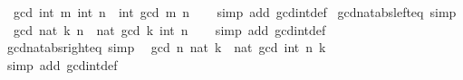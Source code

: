 \begin{isabellebody}
\ \ {\isachardoublequoteopen}gcd\ {\isacharparenleft}{\kern0pt}int\ m{\isacharparenright}{\kern0pt}\ {\isacharparenleft}{\kern0pt}int\ n{\isacharparenright}{\kern0pt}\ {\isacharequal}{\kern0pt}\ int\ {\isacharparenleft}{\kern0pt}gcd\ m\ n{\isacharparenright}{\kern0pt}{\isachardoublequoteclose}\isanewline
%
\isadelimproof
\ \ %
\endisadelimproof
%
\isatagproof
{}\isamarkupfalse%
\ {\isacharparenleft}{\kern0pt}simp\ add{\isacharcolon}{\kern0pt}\ gcd{\isacharunderscore}{\kern0pt}int{\isacharunderscore}{\kern0pt}def{\isacharparenright}{\kern0pt}%
\endisatagproof
{\isafoldproof}%
%
\isadelimproof
\isanewline
%
\endisadelimproof
\isanewline
{}\isamarkupfalse%
\ gcd{\isacharunderscore}{\kern0pt}nat{\isacharunderscore}{\kern0pt}abs{\isacharunderscore}{\kern0pt}left{\isacharunderscore}{\kern0pt}eq\ {\isacharbrackleft}{\kern0pt}simp{\isacharbrackright}{\kern0pt}{\isacharcolon}{\kern0pt}\isanewline
\ \ {\isachardoublequoteopen}gcd\ {\isacharparenleft}{\kern0pt}nat\ {\isasymbar}k{\isasymbar}{\isacharparenright}{\kern0pt}\ n\ {\isacharequal}{\kern0pt}\ nat\ {\isacharparenleft}{\kern0pt}gcd\ k\ {\isacharparenleft}{\kern0pt}int\ n{\isacharparenright}{\kern0pt}{\isacharparenright}{\kern0pt}{\isachardoublequoteclose}\isanewline
%
\isadelimproof
\ \ %
\endisadelimproof
%
\isatagproof
{}\isamarkupfalse%
\ {\isacharparenleft}{\kern0pt}simp\ add{\isacharcolon}{\kern0pt}\ gcd{\isacharunderscore}{\kern0pt}int{\isacharunderscore}{\kern0pt}def{\isacharparenright}{\kern0pt}%
\endisatagproof
{\isafoldproof}%
%
\isadelimproof
\isanewline
%
\endisadelimproof
\isanewline
{}\isamarkupfalse%
\ gcd{\isacharunderscore}{\kern0pt}nat{\isacharunderscore}{\kern0pt}abs{\isacharunderscore}{\kern0pt}right{\isacharunderscore}{\kern0pt}eq\ {\isacharbrackleft}{\kern0pt}simp{\isacharbrackright}{\kern0pt}{\isacharcolon}{\kern0pt}\isanewline
\ \ {\isachardoublequoteopen}gcd\ n\ {\isacharparenleft}{\kern0pt}nat\ {\isasymbar}k{\isasymbar}{\isacharparenright}{\kern0pt}\ {\isacharequal}{\kern0pt}\ nat\ {\isacharparenleft}{\kern0pt}gcd\ {\isacharparenleft}{\kern0pt}int\ n{\isacharparenright}{\kern0pt}\ k{\isacharparenright}{\kern0pt}{\isachardoublequoteclose}\isanewline
%
\isadelimproof
\ \ %
\endisadelimproof
%
\isatagproof
{}\isamarkupfalse%
\ {\isacharparenleft}{\kern0pt}simp\ add{\isacharcolon}{\kern0pt}\ gcd{\isacharunderscore}{\kern0pt}int{\isacharunderscore}{\kern0pt}def{\isacharparenright}{\kern0pt}%
\endisatagproof
{\isafoldproof}%
%
\isadelimproof
\isanewline
%
\endisadelimproof
\isanewline
{}\isamarkupfalse%

\end{isabellebody}
